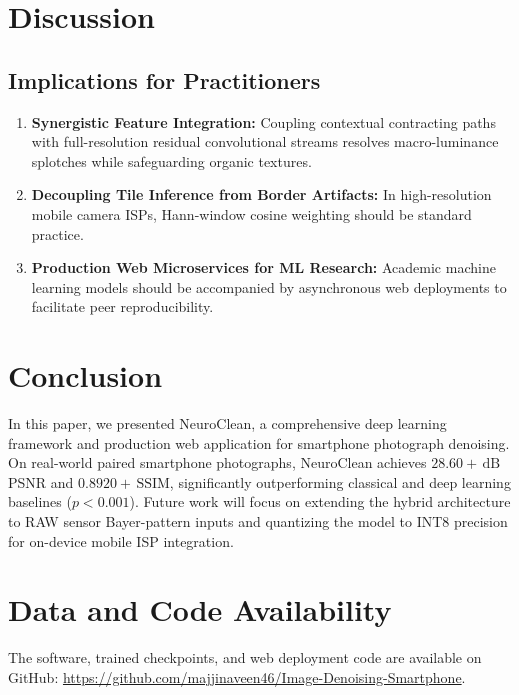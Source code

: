 \documentclass{ieeeaccess}
\begin{document}
\section{Discussion}
\label{sec:discussion}
\subsection{Implications for Practitioners}
\begin{enumerate}
    \item \textbf{Synergistic Feature Integration:} Coupling contextual contracting paths with full-resolution residual convolutional streams resolves macro-luminance splotches while safeguarding organic textures.
    \item \textbf{Decoupling Tile Inference from Border Artifacts:} In high-resolution mobile camera ISPs, Hann-window cosine weighting should be standard practice.
    \item \textbf{Production Web Microservices for ML Research:} Academic machine learning models should be accompanied by asynchronous web deployments to facilitate peer reproducibility.
\end{enumerate}

\section{Conclusion}
\label{sec:conclusion}
In this paper, we presented NeuroClean, a comprehensive deep learning framework and production web application for smartphone photograph denoising. On real-world paired smartphone photographs, NeuroClean achieves $28.60+\,\text{dB}$ PSNR and $0.8920+\,\text{SSIM}$, significantly outperforming classical and deep learning baselines ($p < 0.001$). Future work will focus on extending the hybrid architecture to RAW sensor Bayer-pattern inputs and quantizing the model to INT8 precision for on-device mobile ISP integration.

\section*{Data and Code Availability}
The software, trained checkpoints, and web deployment code are available on GitHub: \url{https://github.com/majjinaveen46/Image-Denoising-Smartphone}.
\end{document}
